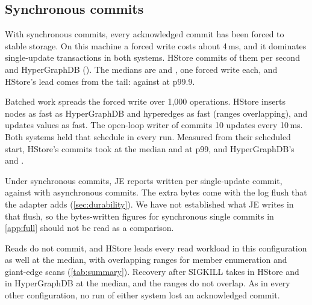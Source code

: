 \subsection{Synchronous commits}
\label{sec:sync}

With synchronous commits, every acknowledged commit has been forced to stable storage. On this machine a forced write costs about 4\,ms, and it dominates single-update transactions in both systems. HStore commits  of them per second and HyperGraphDB  (). The medians are  and , one forced write each, and HStore's lead comes from the tail:  against  at p99.9.

Batched work spreads the forced write over 1,000 operations. HStore inserts nodes  as fast as HyperGraphDB and hyperedges  as fast (ranges overlapping), and updates values  as fast. The open-loop writer of  commits 10 updates every 10\,ms. Both systems held that schedule in every run. Measured from their scheduled start, HStore's commits took  at the median and  at p99, and HyperGraphDB's  and .

Under synchronous commits, JE reports  written per single-update commit, against  with asynchronous commits. The extra bytes come with the log flush that the adapter adds (\cref{sec:durability}). We have not established what JE writes in that flush, so the bytes-written figures for synchronous single commits in \cref{app:full} should not be read as a comparison.

Reads do not commit, and HStore leads every read workload in this configuration as well at the median, with overlapping ranges for member enumeration and giant-edge scans (\cref{tab:summary}). Recovery after SIGKILL takes  in HStore and  in HyperGraphDB at the median, and the ranges do not overlap. As in every other configuration, no run of either system lost an acknowledged commit.
